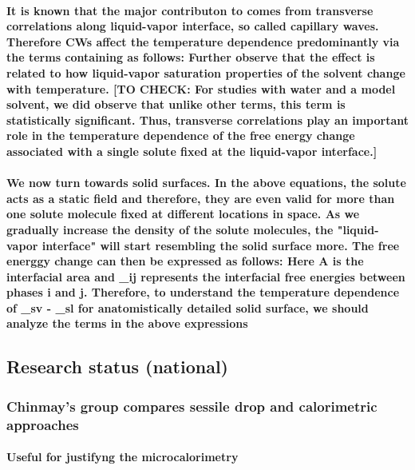 \documentclass[a4paper,12pt,single,pdftex]{scrartcl}
\begin{document}
{\label{ID_1305040262}\paragraph{ It is known that the major contributon to \chi comes from transverse correlations along liquid-vapor interface, so called capillary waves. Therefore CWs affect the temperature dependence predominantly via the terms containing \chi as follows: Further observe that the effect is related to how liquid-vapor saturation properties of the solvent change with temperature. [TO CHECK: For studies with water and a model solvent, we did observe that unlike other terms, this term is statistically significant. Thus, transverse correlations play an important role in the temperature dependence of the free energy change associated with a single solute fixed at the liquid-vapor interface.]}

\label{ID_276381896}\paragraph{ We now turn towards solid surfaces. In the above equations, the solute acts as a static field and therefore, they are even valid for more than one solute molecule fixed at different locations in space. As we gradually increase the density of the solute molecules, the "liquid-vapor interface" will start  resembling the solid surface more. The free energgy change \Delta \mu can then be expressed as follows: Here A is the interfacial area and \gamma_{ij} represents the interfacial free energies between phases i and j. Therefore, to understand the temperature dependence of \gamma_{sv} - \gamma_{sl} for anatomistically detailed solid surface, we should analyze the terms in the above expressions}

\label{ID_374576713}\subsection{Research status (national)}

\label{ID_135785427}\subsubsection{Chinmay's group compares sessile drop and calorimetric approaches}

\label{ID_1532965186}\paragraph{Useful for justifyng the microcalorimetry}

}
\end{document}
